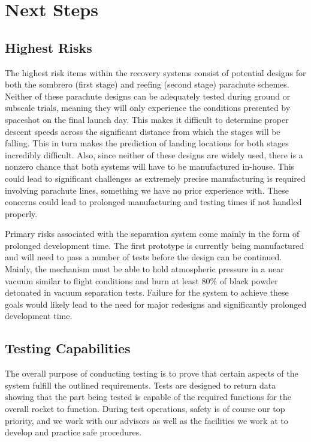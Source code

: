 \section{Next Steps} \label{section:nextsteps}
\subsection{Highest Risks}


The highest risk items within the recovery systems consist of potential designs for both the sombrero (first stage) and reefing (second stage) parachute schemes. Neither of these parachute designs can be adequately tested during ground or subscale trials, meaning they will only experience the conditions presented by spaceshot on the final launch day. This makes it difficult to determine proper descent speeds across the significant distance from which the stages will be falling. This in turn makes the prediction of landing locations for both stages incredibly difficult. Also, since neither of these designs are widely used, there is a nonzero chance that both systems will have to be manufactured in-house. This could lead to significant challenges as extremely precise manufacturing is required involving parachute lines, something we have no prior experience with. These concerns could lead to prolonged manufacturing and testing times if not handled properly.

Primary risks associated with the separation system come mainly in the form of prolonged development time. The first prototype is currently being manufactured and will need to pass a number of tests before the design can be continued. Mainly, the mechanism must be able to hold atmospheric pressure in a near vacuum similar to flight conditions and burn at least 80\% of black powder detonated in vacuum separation tests. Failure for the system to achieve these goals would likely lead to the need for major redesigns and significantly prolonged development time.



\subsection{Testing Capabilities}
The overall purpose of conducting testing is to prove that certain aspects of the system fulfill the outlined requirements. Tests are designed to return data showing that the part being tested is capable of the required functions for the overall rocket to function. During test operations, safety is of course our top priority, and we work with our advisors as well as the facilities we work at to develop and practice safe procedures.

